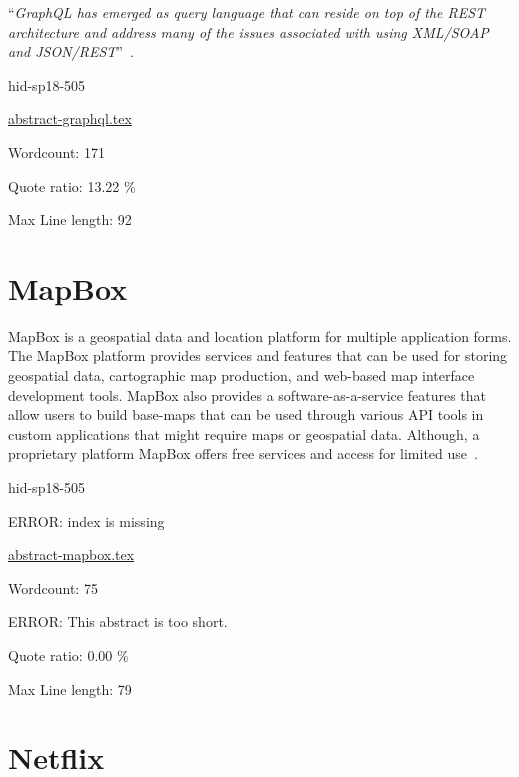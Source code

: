 \color{blue}``\emph{GraphQL has emerged as query language that can reside on top of the REST
architecture and address many of the issues associated with using XML/SOAP and
JSON/REST}''\color{black}~\cite{hid-sp18-505-GraphQL2018}.


\begin{IU}

hid-sp18-505

\href{https://github.com/cloudmesh-community/hid-sp18-505/blob/master//technology/abstract-graphql.tex}{abstract-graphql.tex}

 

Wordcount: 171


Quote ratio: 13.22 \%
 
Max Line length: 92
\end{IU}

\section{MapBox}

MapBox is a geospatial data and location platform for multiple application
forms.  The MapBox platform provides services and features that can be used for
storing geospatial data, cartographic map production, and web-based map
interface development tools.  MapBox also provides a software-as-a-service
features that allow users to build base-maps that can be used through various
API tools in custom applications that might require maps or geospatial
data.  Although, a proprietary platform MapBox offers free services and access
for limited use~\cite{hid-sp18-505-MapBox2018}.


\begin{IU}

hid-sp18-505

ERROR: index is missing

\href{https://github.com/cloudmesh-community/hid-sp18-505/blob/master//technology/abstract-mapbox.tex}{abstract-mapbox.tex}

 

Wordcount: 75

ERROR: This abstract is too short.


Quote ratio: 0.00 \%
 
Max Line length: 79
\end{IU}

\section{Netflix}

